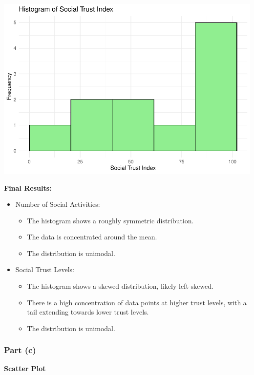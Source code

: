 \documentclass[
  11pt,
]{article}
\providecommand{\tightlist}{%
  \setlength{\itemsep}{0pt}\setlength{\parskip}{0pt}}
\begin{document}
\includegraphics{Problem-Sets/Answers-Files/Answers-PS1/unnamed-chunk-6-1.pdf}

\textbf{Final Results:}

\begin{itemize}
\tightlist
\item
  Number of Social Activities:

  \begin{itemize}
  \tightlist
  \item
    The histogram shows a roughly symmetric distribution.
  \item
    The data is concentrated around the mean.
  \item
    The distribution is unimodal.
  \end{itemize}
\item
  Social Trust Levels:

  \begin{itemize}
  \tightlist
  \item
    The histogram shows a skewed distribution, likely left-skewed.
  \item
    There is a high concentration of data points at higher trust levels,
    with a tail extending towards lower trust levels.
  \item
    The distribution is unimodal.
  \end{itemize}
\end{itemize}

\subsubsection{Part (c)}\label{part-c}

\textbf{Scatter Plot}
\end{document}
